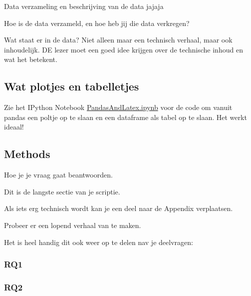 Data verzameling en beschrijving van de data jajaja

Hoe is de data verzameld, en hoe heb jij die data verkregen?


Wat staat er in de data? Niet alleen maar een technisch verhaal, maar ook inhoudelijk. DE lezer moet een goed idee krijgen over de technische inhoud en wat het betekent.

\newpage


\pagebreak
\subsection{Wat plotjes en tabelletjes}

Zie het IPython Notebook \url{PandasAndLatex.ipynb} voor de code om vanuit pandas een poltje op te slaan en een dataframe als tabel op te slaan. Het werkt ideaal! 






\pagebreak


%

%		

\pagebreak
\subsection{Methods}
Hoe je je vraag gaat beantwoorden.


Dit is de langste sectie van je scriptie. 

Als iets erg technisch wordt kan je een deel naar de Appendix verplaatsen. 

Probeer er een lopend verhaal van te maken.

Het is heel handig dit ook weer op te delen nav je deelvragen:

\subsubsection{RQ1}

\subsubsection{RQ2}
\fi

